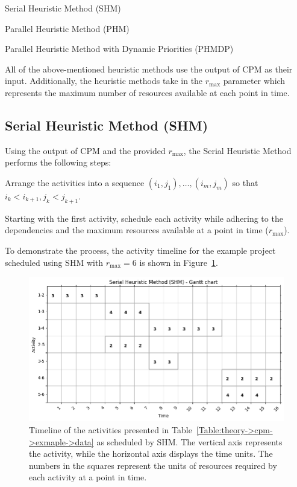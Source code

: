 \begin{tight_itemize}
	\item Serial Heuristic Method (SHM)
	\item Parallel Heuristic Method (PHM)
	\item Parallel Heuristic Method with Dynamic Priorities (PHMDP)
\end{tight_itemize}

All of the above-mentioned heuristic methods use the output of CPM as their input.
Additionally, the heuristic methods take in the $r_\mathrm{max}$ parameter which represents the maximum number of resources available at each point in time.



\subsection{Serial Heuristic Method (SHM)}
Using the output of CPM and the provided $r_\mathrm{max}$, the Serial Heuristic Method performs the following steps:

\begin{tight_enumerate}
	\item Arrange the activities into a sequence $\left(i_1, j_1\right),  \ldots, \left(i_m, j_m\right)$ so that $i_k < i_{k+1}, j_k < j_{k+1}$.
	\item Starting with the first activity, schedule each activity while adhering to the dependencies and the maximum resources available at a point in time ($r_\mathrm{max}$).
\end{tight_enumerate}

To demonstrate the process, the activity timeline for the example project scheduled using SHM with $r_\mathrm{max} = 6$ is shown in Figure~\ref{Figure:theory->shm->example->timeline}.

\begin{figure}[ht!]
	\centering
	\includegraphics[width=\linewidth]{images/shm_example_project.png}
	\caption{Timeline of the activities presented in Table~\ref{Table:theory->cpm->exmaple->data} as scheduled by SHM.
		The vertical axis represents the activity, while the horizontal axis displays the time units.
		The numbers in the squares represent the units of resources required by each activity at a point in time.
	}
	\label{Figure:theory->shm->example->timeline}
\end{figure}

